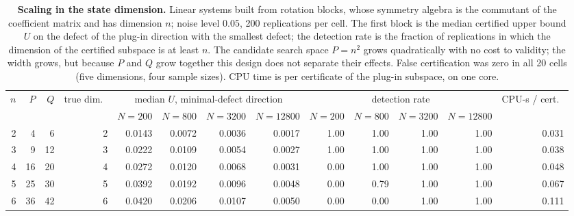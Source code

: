 \begin{table}[!htbp]
\centering\small
\begin{adjustbox}{max width=\textwidth, max totalheight=0.9\textheight}
\begin{tabular}{rrrrrrrrrrrrr}
\toprule
$n$ & $P$ & $Q$ & true dim.\ & \multicolumn{4}{c}{median $U$, minimal-defect direction} & \multicolumn{4}{c}{detection rate} & CPU-s / cert.\ \\
\cmidrule(lr){5-8}\cmidrule(lr){9-12}
 & & & & $N{=}200$ & $N{=}800$ & $N{=}3200$ & $N{=}12800$ & $N{=}200$ & $N{=}800$ & $N{=}3200$ & $N{=}12800$ & \\
\midrule
2 & 4 & 6 & 2 & 0.0143 & 0.0072 & 0.0036 & 0.0017 & 1.00 & 1.00 & 1.00 & 1.00 & 0.031 \\
3 & 9 & 12 & 3 & 0.0222 & 0.0109 & 0.0054 & 0.0027 & 1.00 & 1.00 & 1.00 & 1.00 & 0.038 \\
4 & 16 & 20 & 4 & 0.0272 & 0.0120 & 0.0068 & 0.0031 & 0.00 & 1.00 & 1.00 & 1.00 & 0.048 \\
5 & 25 & 30 & 5 & 0.0392 & 0.0192 & 0.0096 & 0.0048 & 0.00 & 0.79 & 1.00 & 1.00 & 0.067 \\
6 & 36 & 42 & 6 & 0.0420 & 0.0206 & 0.0107 & 0.0050 & 0.00 & 0.00 & 1.00 & 1.00 & 0.111 \\
\bottomrule
\end{tabular}
\end{adjustbox}
\caption{\textbf{Scaling in the state dimension.} Linear systems built from rotation blocks, whose symmetry algebra is the commutant of the coefficient matrix and has dimension $n$; noise level $0.05$, 200 replications per cell. The first block is the median certified upper bound $U$ on the defect of the plug-in direction with the smallest defect; the detection rate is the fraction of replications in which the dimension of the certified subspace is at least $n$. The candidate search space $P = n^2$ grows quadratically with no cost to validity; the width grows, but because $P$ and $Q$ grow together this design does not separate their effects. False certification was zero in all 20 cells (five dimensions, four sample sizes). CPU time is per certificate of the plug-in subspace, on one core.}
\label{stab:scaling}
\end{table}
